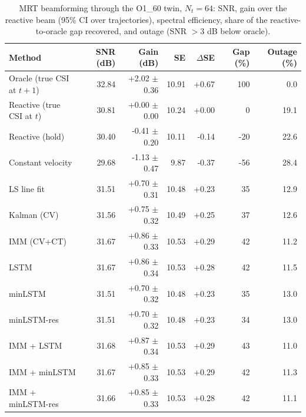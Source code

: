 \begin{table}[t]
\centering
\caption{MRT beamforming through the O1\_60 twin, $N_t{=}64$: SNR, gain over the reactive beam (95\% CI over trajectories), spectral efficiency, share of the reactive-to-oracle gap recovered, and outage (SNR $>$3 dB below oracle).}\label{tab:snr}
\begin{tabular}{lrrrrrr}
\toprule
Method & SNR (dB) & Gain (dB) & SE & $\Delta$SE & Gap (\%) & Outage (\%) \\
\midrule
Oracle (true CSI at $t{+}1$) & 32.84 & +2.02 $\pm$ 0.36 & 10.91 & +0.67 & 100 & 0.0 \\
Reactive (true CSI at $t$) & 30.81 & +0.00 $\pm$ 0.00 & 10.24 & +0.00 & 0 & 19.1 \\
Reactive (hold) & 30.40 & -0.41 $\pm$ 0.20 & 10.11 & -0.14 & -20 & 22.6 \\
Constant velocity & 29.68 & -1.13 $\pm$ 0.47 & 9.87 & -0.37 & -56 & 28.4 \\
LS line fit & 31.51 & +0.70 $\pm$ 0.31 & 10.48 & +0.23 & 35 & 12.9 \\
Kalman (CV) & 31.56 & +0.75 $\pm$ 0.32 & 10.49 & +0.25 & 37 & 12.6 \\
IMM (CV+CT) & 31.67 & +0.86 $\pm$ 0.33 & 10.53 & +0.29 & 42 & 11.2 \\
LSTM & 31.67 & +0.86 $\pm$ 0.34 & 10.53 & +0.28 & 42 & 11.5 \\
minLSTM & 31.51 & +0.70 $\pm$ 0.32 & 10.48 & +0.23 & 35 & 13.0 \\
minLSTM-res & 31.51 & +0.70 $\pm$ 0.32 & 10.48 & +0.23 & 34 & 13.0 \\
IMM + LSTM & 31.68 & +0.87 $\pm$ 0.34 & 10.53 & +0.29 & 43 & 11.0 \\
IMM + minLSTM & 31.67 & +0.85 $\pm$ 0.33 & 10.53 & +0.29 & 42 & 11.3 \\
IMM + minLSTM-res & 31.66 & +0.85 $\pm$ 0.33 & 10.53 & +0.28 & 42 & 11.1 \\
\bottomrule
\end{tabular}
\end{table}
